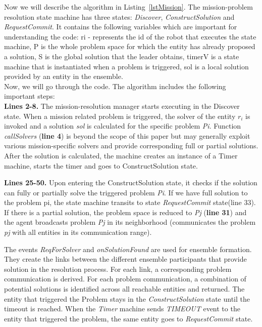 \documentclass[journal]{IEEEtran}
\theoremstyle{definition}
\begin{document}
 
Now we will describe the algorithm in Listing~\ref{lstMission}. 
The mission-problem resolution state machine has three states: \textit{Discover}, \textit{ConstructSolution} and \textit{RequestCommit}. 
It contains the following variables which are important for understanding the code: 
ri - represents the id of the robot that executes the state machine, P is the whole problem space for which the entity has already proposed a solution, S is the global solution that the leader obtains, timerV is a state machine that is instantiated when a problem is triggered, sol is a local solution provided by an entity in the ensemble. \\
Now, we will go through the code.
The algorithm includes the following important steps: \\
\textbf{Lines 2-8.} The mission-resolution manager starts executing in the Discover state. When a mission related problem is triggered, the solver of the entity $r_i$ is invoked and a solution \textit{sol}
is calculated for the specific problem \textit{Pi}. Function \textit{callSolvers} (\textbf{line 4}) 
is beyond the scope of this paper but may generally exploit
various mission-specific solvers and provide corresponding full or partial solutions.  After the solution is calculated, the machine creates an instance of a Timer machine, starts the timer and goes to ConstructSolution state.

\textbf{Lines 25-50.} Upon entering the ConstructSolution state, 
it checks if the solution can fully or partially solve the triggered problem \textit{Pi}. If we have full solution to the problem pi, the state machine transits to state \textit{RequestCommit} state(line 33).
If there is a partial solution, the problem space is reduced to \textit{Pj} (\textbf{line 31}) and  the agent broadcasts problem \textit{Pj} in its neighborhood (communicates the problem \textit{pj} with all entities in its communication range).

The events \textit{ReqForSolver} and \textit{onSolutionFound} are used for ensemble formation. 
They create the links between the different ensemble participants that provide solution in the resolution process. For each link, a corresponding problem communication is derived. For each problem communication, a combination of potential solutions is identified across all reachable entities and returned. The entity that triggered the Problem stays in the \textit{ConstructSolution} state until the timeout is reached. When the \textit{Timer} machine sends \textit{TIMEOUT} event to the entity that triggered the problem, the same entity goes to \textit{RequestCommit} state.
\end{document}
